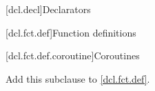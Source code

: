 
\begingroup
\renewcommand{\cleardoublepage}{}
\renewcommand{\clearpage}{}
[dcl.decl]{Declarators}
\endgroup

\setcounter{section}{3}
\setcounter{subsection}{4}

%

\setcounter{section}{3}
[dcl.fct.def]{Function definitions}

\setcounter{subsection}{3}
[dcl.fct.def.coroutine]{Coroutines}

Add this subclause to \ref{dcl.fct.def}.

